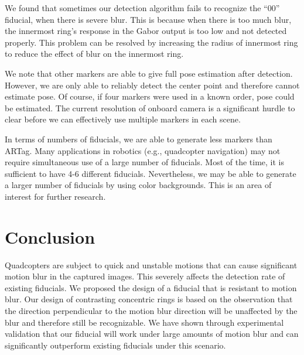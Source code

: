\documentclass[10pt,twocolumn,letterpaper]{article}
\begin{document}
We found that sometimes our detection algorithm fails to recognize the
``00'' fiducial, when there is severe blur.  This is because when there
is too much blur, the innermost ring's response in the Gabor output is
too low and not detected properly.  This problem can be resolved by
increasing the radius of innermost ring to reduce the effect of blur
on the innermost ring.

We note that other markers are able to give full pose estimation after
detection.  However, we are only able to reliably detect the center
point and therefore cannot estimate pose.  Of course, if four markers
were used in a known order, pose could be estimated. The current
resolution of onboard camera is a significant  hurdle to clear before we
can effectively use multiple markers in each scene.

In terms of numbers of fiducials, we are able to generate less markers
than ARTag. Many applications in robotics (e.g., quadcopter navigation)
may not require simultaneous use of a large number of fiducials.  Most
of the time, it is sufficient to have 4-6 different
fiducials. Nevertheless, we may be able to generate a larger number of
fiducials by using color backgrounds. This is an area of interest for
further research.

\section{Conclusion}

Quadcopters are subject to quick and unstable motions that can cause
significant motion blur in the captured images. This severely affects
the detection rate of existing fiducials. We proposed the
design of a fiducial that is resistant to motion blur. Our design of
contrasting concentric rings is based on the observation that the
direction perpendicular to the motion blur direction will be
unaffected by the blur and therefore still be recognizable. We have
shown through experimental validation that our fiducial will work
under large amounts of motion blur and can significantly outperform
existing fiducials under this scenario.

{\small


}
\end{document}
